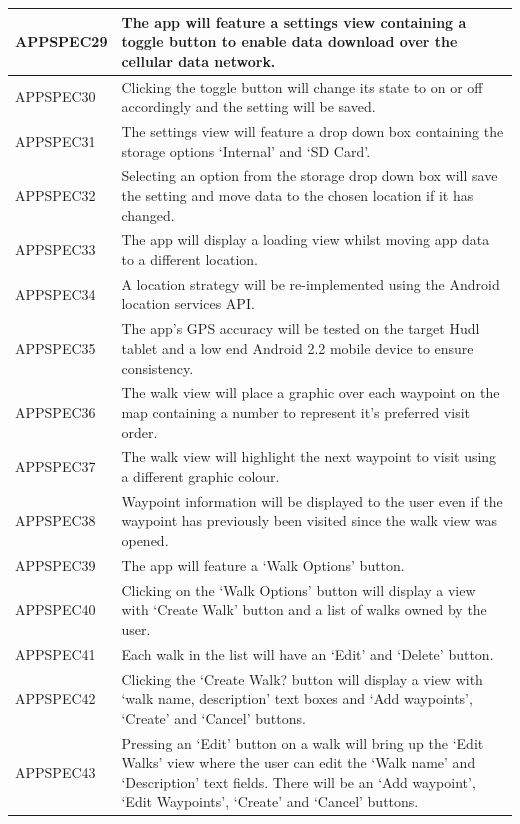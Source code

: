 \documentclass[11pt,a4paper]{article}
\begin{document}
\begin{longtable}{|p{2.5cm}p{13cm}|}
APPSPEC29 & The app will feature a settings view containing a toggle button to enable data download over the cellular data network. \\ \hline
APPSPEC30 & Clicking the toggle button will change its state to on or off accordingly and the setting will be saved. \\ \hline
APPSPEC31 & The settings view will feature a drop down box containing the storage options `Internal' and `SD Card'. \\ \hline
APPSPEC32 & Selecting an option from the storage drop down box will save the setting and move data to the chosen location if it has changed. \\ \hline
APPSPEC33 & The app will display a loading view whilst moving app data to a different location. \\ \hline
APPSPEC34 & A location strategy will be re-implemented using the Android location services API. \\ \hline
APPSPEC35 & The app's GPS accuracy will be tested on the target Hudl tablet and a low end Android 2.2 mobile device to ensure consistency. \\ \hline
APPSPEC36 & The walk view will place a graphic over each waypoint on the map containing a number to represent it's preferred visit order. \\ \hline
APPSPEC37 & The walk view will highlight the next waypoint to visit using a different graphic colour. \\ \hline
APPSPEC38 & Waypoint information will be displayed to the user even if the waypoint has previously been visited since the walk view was opened. \\ \hline
APPSPEC39 & The app will feature a `Walk Options' button.\\ \hline
APPSPEC40 & Clicking on the `Walk Options' button will display a view with `Create Walk' button and a list of walks owned by the user. \\ \hline
APPSPEC41 & Each walk in the list will have an `Edit' and `Delete' button.\\ \hline
APPSPEC42 & Clicking the `Create Walk? button will display a view with `walk name, description' text boxes and `Add waypoints', `Create' and `Cancel' buttons.\\ \hline
APPSPEC43 & Pressing an `Edit' button on a walk will bring up the `Edit Walks' view where the user can edit the `Walk name' and `Description' text fields. There will be an `Add waypoint', `Edit Waypoints', `Create' and `Cancel' buttons. \\ \hline

\end{longtable}
\end{document}
